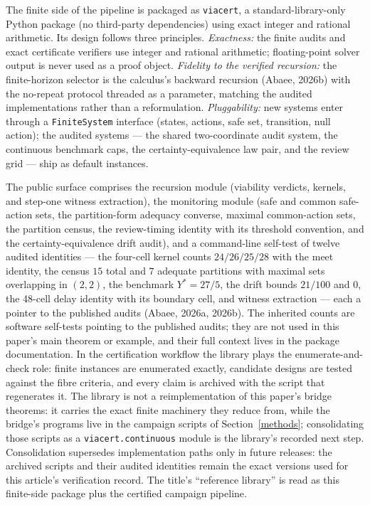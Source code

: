 \documentclass[10pt,twocolumn]{article}
\theoremstyle{plain}
\theoremstyle{definition}
\theoremstyle{remark}
\begin{document}
The finite side of the pipeline is packaged as \texttt{viacert}, a
standard-library-only Python package (no third-party dependencies) using
exact integer and rational arithmetic.
Its design follows three principles. \emph{Exactness:} the finite audits and exact certificate verifiers use
integer and rational arithmetic; floating-point solver output is never used
as a proof object.
\emph{Fidelity to the verified recursion:} the finite-horizon selector is the
calculus's backward recursion (Abaee, 2026b) with the no-repeat protocol
threaded as a parameter, matching the audited implementations rather than a
reformulation. \emph{Pluggability:} new systems enter through a
\texttt{FiniteSystem} interface (states, actions, safe set, transition, null
action); the audited systems --- the shared two-coordinate audit system, the
continuous benchmark caps, the certainty-equivalence law pair, and the
review grid --- ship as default instances.

The public surface comprises the recursion module (viability verdicts,
kernels, and step-one witness extraction), the monitoring module (safe and
common safe-action sets, the partition-form adequacy converse, maximal
common-action sets, the partition census, the review-timing identity with
its threshold convention, and the certainty-equivalence drift audit), and a
command-line self-test of twelve audited identities --- the four-cell kernel
counts \(24/26/25/28\) with the meet identity, the census \(15\) total and
\(7\) adequate partitions with maximal sets overlapping in \((2,2)\), the
benchmark \(Y^{*} = 27/5\), the drift bounds \(21/100\) and \(0\), the
48-cell delay identity with its boundary cell, and witness extraction ---
each a pointer to the published audits (Abaee, 2026a, 2026b). The
inherited counts are software self-tests pointing to the published audits;
they are not used in this paper's main theorem or example, and their full
context lives in the package documentation. In the certification workflow
the library plays the enumerate-and-check role:
finite instances are enumerated exactly, candidate designs are tested
against the fibre criteria, and every claim is archived with the script that
regenerates it. The library is not a reimplementation of this paper's bridge theorems: it carries the exact finite machinery they reduce from, while the bridge's programs live in the campaign scripts of Section~\ref{methods}; consolidating those scripts as a \texttt{viacert.continuous} module is the library's recorded next step. Consolidation supersedes implementation paths only in future releases:
the archived scripts and their audited identities remain the exact versions
used for this article's verification record. The title's ``reference
library'' is read as this finite-side package plus the certified campaign
pipeline.
\end{document}
